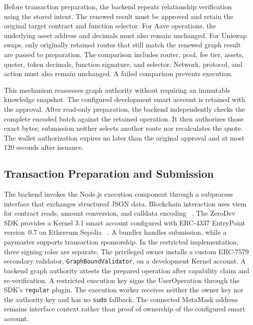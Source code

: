 Before transaction preparation, the backend repeats
relationship verification using the stored intent.
The renewed result must be approved and retain the
original target contract and function selector.
For Aave operations, the underlying asset address and
decimals must also remain unchanged. For Uniswap swaps,
only originally retained routes that still match the renewed graph result
are passed to preparation. The comparison includes router, pool, fee tier,
assets, quoter, token decimals, function signature, and selector. Network,
protocol, and action must also remain unchanged. A failed comparison
prevents execution.


This mechanism reassesses graph authority without requiring an immutable
knowledge snapshot. The configured development smart account is retained
with the approval. After read-only preparation, the backend independently
checks the complete encoded batch against the retained operation. It then
authorizes those exact bytes; submission neither selects another route nor
recalculates the quote. The wallet authorization expires no later than the
original approval and at most 120 seconds after issuance.


\subsection{Transaction Preparation and Submission}

The backend invokes the Node.js execution component
through a subprocess interface that exchanges structured
JSON data. Blockchain interaction uses viem for contract
reads, amount conversion, and calldata encoding
~\cite{implViem}. The ZeroDev SDK provides a Kernel
3.1 smart account configured with ERC-4337 EntryPoint
version~0.7 on Ethereum Sepolia
~\cite{implZeroDevSDK,implERC4337}. A bundler handles
submission, while a paymaster supports transaction
sponsorship. In the restricted implementation, three signing roles are
separate. The privileged owner installs a custom ERC-7579 secondary
validator, \texttt{GraphBoundValidator}, on a development Kernel account.
A backend graph authority attests the prepared operation after capability
claim and re-verification. A restricted execution key signs the
UserOperation through the SDK's \texttt{regular} plugin. The execution
worker receives neither the owner key nor the authority key and has no
\texttt{sudo} fallback. The connected MetaMask address remains interface
context rather than proof of ownership of the configured smart account.

